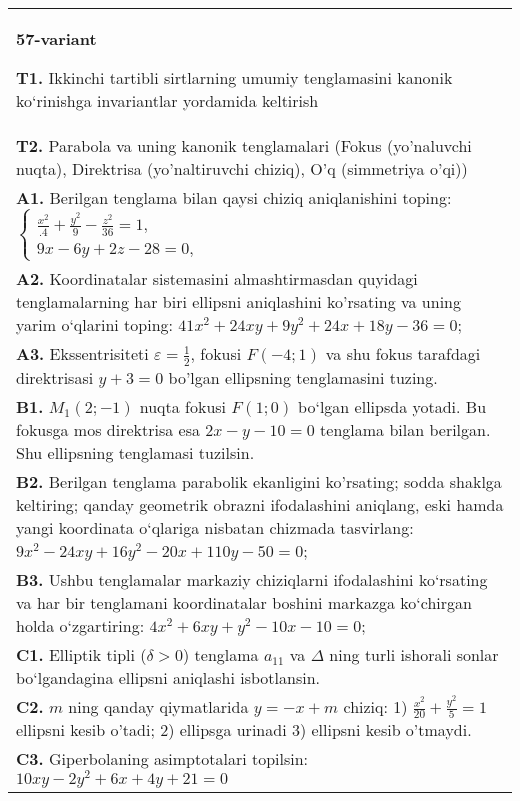 \documentclass{article}
\begin{document}
\begin{tabular}{m{17cm}}
\textbf{57-variant}
\newline

\textbf{T1.} Ikkinchi tartibli sirtlarning umumiy tenglamasini kanonik ko‘rinishga invariantlar yordamida keltirish \\
\textbf{T2.} Parabola va uning kanonik tenglamalari (Fokus (yo’naluvchi nuqta), Direktrisa (yo’naltiruvchi chiziq), O’q (simmetriya o’qi)) \\
\textbf{A1.} Berilgan tenglama bilan qaysi chiziq aniqlanishini toping: $\left\{\begin{array}{l}\frac{x^2}{.4}+\frac{y^2}{9}-\frac{z^2}{36}=1, \\ 9 x-6 y+2 z-28=0,\end{array}\right.$ \\
\textbf{A2.} Koordinatalar sistemasini almashtirmasdan quyidagi tenglamalarning har biri ellipsni aniqlashini ko'rsating va uning yarim o‘qlarini toping: $41 x^2+24 x y+9 y^2+24 x+18 y-36=0$; \\
\textbf{A3.} Ekssentrisiteti $\varepsilon=\frac{1}{2}$, fokusi $F(-4 ; 1)$ va shu fokus tarafdagi direktrisasi $y+3=0$ bo'lgan ellipsning tenglamasini tuzing. \\
\textbf{B1.} $M_1 (2;-1)$ nuqta fokusi $F (1;0)$ bo‘lgan ellipsda yotadi. Bu fokusga mos direktrisa esa $2x-y-10=0$ tenglama bilan berilgan. Shu ellipsning tenglamasi tuzilsin. \\
\textbf{B2.} Berilgan tenglama parabolik ekanligini ko'rsating; sodda shaklga keltiring; qanday geometrik obrazni ifodalashini aniqlang, eski hamda yangi koordinata o‘qlariga nisbatan chizmada tasvirlang: $9 x^2-24 x y+16 y^2-20 x+110 y-50=0$; \\
\textbf{B3.} Ushbu tenglamalar markaziy chiziqlarni ifodalashini ko‘rsating va har bir tenglamani koordinatalar boshini markazga ko‘chirgan holda o‘zgartiring: $4 x^2+6 x y+y^2-10 x-10=0$; \\
\textbf{C1.} Elliptik tipli ($\delta>0$) tenglama $a_{11}$ va $\Delta$ ning turli ishorali sonlar bo‘lgandagina ellipsni aniqlashi isbotlansin. \\
\textbf{C2.} $m$ ning qanday qiymatlarida $y=-x+m$ chiziq: 1) $\frac{x^2}{20}+\frac{y^2}{5}=1$ ellipsni kesib o'tadi; 2) ellipsga urinadi 3) ellipsni kesib o'tmaydi. \\
\textbf{C3.} Giperbolaning asimptotalari topilsin: $10 x y-2 y^2+6 x+4 y+21=0$ \\

\end{tabular}
\vspace{1cm}
\end{document}

